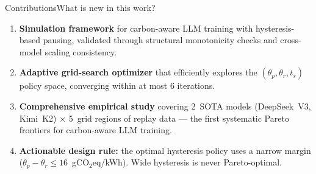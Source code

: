 \begin{frame}[t]{Contributions}{What is new in this work?}

  \begin{enumerate}
    \item \textbf{Simulation framework} for carbon-aware LLM training with
      hysteresis-based pausing, validated through structural monotonicity checks
      and cross-model scaling consistency.

      \vspace{0.2cm}
    \item \textbf{Adaptive grid-search optimizer} that efficiently
      explores the $(\theta_p, \theta_r, t_s)$ policy space,
      converging within at most 6 iterations.

      \vspace{0.2cm}
    \item \textbf{Comprehensive empirical study} covering 2~SOTA models
      (DeepSeek~V3, Kimi~K2) $\times$ 5~grid regions of replay data
      --- the first systematic Pareto frontiers for carbon-aware LLM training.

      \vspace{0.2cm}
    \item \textbf{Actionable design rule:} the optimal hysteresis policy uses a
      narrow margin ($\theta_p - \theta_r \leq 16$~gCO$_2$eq/kWh).
      Wide hysteresis is never Pareto-optimal.
  \end{enumerate}

\end{frame}
